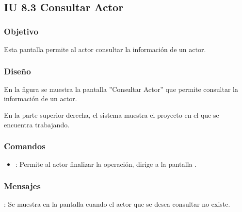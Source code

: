 \subsection{IU 8.3 Consultar Actor}

\subsubsection{Objetivo}
	Esta pantalla permite al actor consultar la información de un actor.
\subsubsection{Diseño}
	En la figura  se muestra la pantalla ''Consultar Actor'' que permite consultar la información de un actor.
	
	En la parte superior derecha, el sistema muestra el proyecto en el que se encuentra trabajando.

\subsubsection{Comandos}
\begin{itemize}
	\item {}: Permite al actor finalizar la operación, dirige a la pantalla .
\end{itemize}

\subsubsection{Mensajes}

\begin{Citemize}
	\item {}: Se muestra en la pantalla  cuando el actor que se desea consultar no existe.
\end{Citemize}
